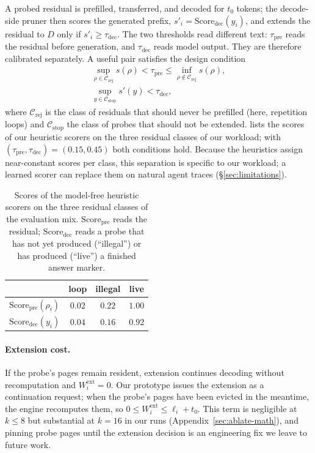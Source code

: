 A probed residual is prefilled, transferred, and decoded for $t_0$ tokens; the decode-side pruner then scores the generated prefix, $s'_i=\mathrm{Score}_{\mathrm{dec}}(y_i)$, and extends the residual to $D$ only if $s'_i\ge\tau_{\mathrm{dec}}$.
The two thresholds read different text: $\tau_{\mathrm{pre}}$ reads the residual before generation, and $\tau_{\mathrm{dec}}$ reads model output.
They are therefore calibrated separately.
A useful pair satisfies the design condition
\begin{gather}
\sup_{\rho\in\mathcal{C}_{\mathrm{rej}}}s(\rho)<\tau_{\mathrm{pre}}\le\inf_{\rho\notin\mathcal{C}_{\mathrm{rej}}}s(\rho), \label{eq:sep-pre}\\
\sup_{y\in\mathcal{C}_{\mathrm{stop}}}s'(y)<\tau_{\mathrm{dec}}, \nonumber
\end{gather}
where $\mathcal{C}_{\mathrm{rej}}$ is the class of residuals that should never be prefilled (here, repetition loops) and $\mathcal{C}_{\mathrm{stop}}$ the class of probes that should not be extended.
 lists the scores of our heuristic scorers on the three residual classes of our workload; with $(\tau_{\mathrm{pre}},\tau_{\mathrm{dec}})=(0.15,0.45)$ both conditions hold.
Because the heuristics assign near-constant scores per class, this separation is specific to our workload; a learned scorer can replace them on natural agent traces (\S\ref{sec:limitations}).

\begin{table}[t]
\centering
\caption{Scores of the model-free heuristic scorers on the three residual classes of the evaluation mix.
$\mathrm{Score}_{\mathrm{pre}}$ reads the residual; $\mathrm{Score}_{\mathrm{dec}}$ reads a probe that has not yet produced (``illegal'') or has produced (``live'') a finished answer marker.}
\label{tab:scores}
\scriptsize
\setlength{\tabcolsep}{4pt}
\begin{tabular}{@{}lccc@{}}
\toprule
 & loop & illegal & live \\
\midrule
$\mathrm{Score}_{\mathrm{pre}}(\rho_i)$ & $0.02$ & $0.22$ & $1.00$ \\
$\mathrm{Score}_{\mathrm{dec}}(y_i)$ & $0.04$ & $0.16$ & $0.92$ \\
\bottomrule
\end{tabular}
\end{table}

\paragraph{Extension cost.}
If the probe's pages remain resident, extension continues decoding without recomputation and $W_i^{\mathrm{ext}}{=}0$.
Our prototype issues the extension as a continuation request; when the probe's pages have been evicted in the meantime, the engine recomputes them, so $0\le W_i^{\mathrm{ext}}\le\ell_i+t_0$.
This term is negligible at $k\le 8$ but substantial at $k{=}16$ in our runs (Appendix~\ref{sec:ablate-math}), and pinning probe pages until the extension decision is an engineering fix we leave to future work.

